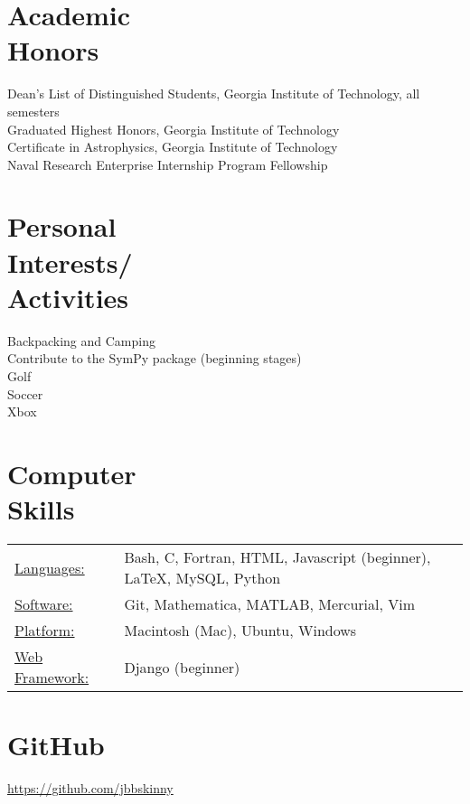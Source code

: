\documentclass[margin]{res}
\begin{document}
\begin{resume}
\section{Academic \\ Honors} 
Dean's List of Distinguished Students, Georgia Institute of Technology, all semesters \\
Graduated Highest Honors, Georgia Institute of Technology \\
Certificate in Astrophysics, Georgia Institute of Technology \\
Naval Research Enterprise Internship Program Fellowship

\section{Personal \\ Interests/ \\Activities}
Backpacking and Camping \\
Contribute to the SymPy package (beginning stages)\\
Golf \\
Soccer \\
Xbox

\section{Computer \\ Skills}
   \begin{tabular}{l p{3in}}
    \underline{Languages:} & Bash, C, Fortran, HTML, Javascript (beginner), \LaTeX, MySQL, Python \\
    \underline{Software:} & Git, Mathematica, MATLAB, Mercurial, Vim \\
    \underline{Platform:} & Macintosh (Mac), Ubuntu, Windows \\
    \underline{Web Framework:} & Django (beginner) 
   \end{tabular}

\section{GitHub}
\url{https://github.com/jbbskinny} \\ \\

\end{resume} 
\end{document}
